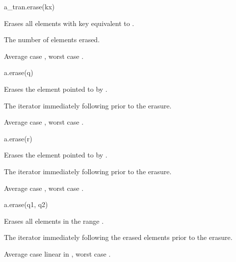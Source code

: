 %
\begin{itemdecl}
a_tran.erase(kx)
\end{itemdecl}

\begin{itemdescr}
\pnum
\result
{}

\pnum
\effects
Erases all elements with key equivalent to .

\pnum
\returns
The number of elements erased.

\pnum
\complexity
Average case ,
worst case .
\end{itemdescr}

%
\begin{itemdecl}
a.erase(q)
\end{itemdecl}

\begin{itemdescr}
\pnum
\result
{}

\pnum
\effects
Erases the element pointed to by .

\pnum
\returns
The iterator immediately following  prior to the erasure.

\pnum
\complexity
Average case , worst case .
\end{itemdescr}

%
\begin{itemdecl}
a.erase(r)
\end{itemdecl}

\begin{itemdescr}
\pnum
\result
{}

\pnum
\effects
Erases the element pointed to by .

\pnum
\returns
The iterator immediately following  prior to the erasure.

\pnum
\complexity
Average case , worst case .
\end{itemdescr}

%
\begin{itemdecl}
a.erase(q1, q2)
\end{itemdecl}

\begin{itemdescr}
\pnum
\result
{}

\pnum
\effects
Erases all elements in the range \tcode{[q1, q2)}.

\pnum
\returns
The iterator immediately following the erased elements prior to the erasure.

\pnum
\complexity
Average case linear in ,
worst case .
\end{itemdescr}

